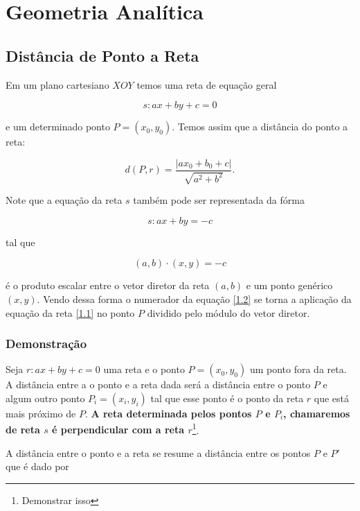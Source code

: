 \chapter{Geometria Analítica}

\section{Distância de Ponto a Reta}

Em um plano cartesiano $XOY$ temos uma reta de equação geral 

\begin{equation}\label{1.1}
s:ax+by+c=0
\end{equation}

 e um determinado ponto $P=(x_0,y_0)$. Temos assim que a distância do ponto a reta:

\begin{equation}\label{1.2}
d(P,r)=\dfrac{|ax_0+b_0+c|}{\sqrt{a^2+b^2}}.
\end{equation}

Note que a equação da reta $s$ também pode ser representada da fórma 

\begin{equation}
s:ax+by=-c
\end{equation}

tal que 

\begin{equation}
(a,b)\cdot (x,y)=-c
\end{equation}

é o produto escalar entre o vetor diretor da reta $(a,b)$ e um ponto genérico $(x,y)$. Vendo dessa forma o numerador da equação \eqref{1.2} se torna a aplicação da equação da reta \eqref{1.1} no ponto $P$ dividido pelo módulo do vetor diretor.
\subsection{Demonstração}

Seja $r:ax+by+c=0$ uma reta e o ponto $P=(x_0,y_0)$ um ponto fora da reta. A distância entre a o ponto e a reta dada será a distância entre o ponto $P$ e algum outro ponto $P_i=(x_i,y_i)$ tal que esse ponto é o ponto da reta $r$ que está mais próximo de $P$. \textbf{A reta determinada pelos pontos $P$ e $P_i$, chamaremos de reta $s$ é perpendicular com a reta $r$}\footnote{Demonstrar isso}.

A distância entre o ponto e a reta se resume a distância entre os pontos $P$ e $P'$ que é dado por

